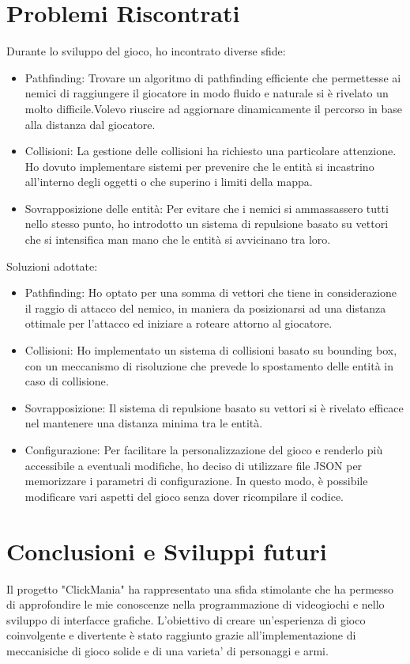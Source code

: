 \documentclass[12pt,a4paper]{report}
\begin{document}
\chapter{Problemi Riscontrati}\label{ch:prog}
Durante lo sviluppo del gioco, ho incontrato diverse sfide:
\begin{itemize}
\item Pathfinding: Trovare un algoritmo di pathfinding efficiente che permettesse ai nemici di raggiungere il giocatore in modo fluido
e naturale si è rivelato un molto difficile.Volevo riuscire ad aggiornare dinamicamente il percorso in base alla distanza dal giocatore.
\item Collisioni: La gestione delle collisioni ha richiesto una particolare attenzione. Ho dovuto implementare sistemi per prevenire che le
entità si incastrino all'interno degli oggetti o che superino i limiti della mappa.
\item Sovrapposizione delle entità: Per evitare che i nemici si ammassassero tutti nello stesso punto, ho introdotto un sistema di repulsione
basato su vettori che si intensifica man mano che le entità si avvicinano tra loro.
\end{itemize}

Soluzioni adottate:
\begin{itemize}
\item Pathfinding: Ho optato per una somma di vettori che tiene in considerazione il raggio di attacco del nemico,
in maniera da posizionarsi ad una distanza ottimale per l’attacco ed iniziare a roteare attorno al giocatore.
\item Collisioni: Ho implementato un sistema di collisioni basato su bounding box, con un meccanismo di risoluzione che prevede
lo spostamento delle entità in caso di collisione.
\item Sovrapposizione: Il sistema di repulsione basato su vettori si è rivelato efficace nel mantenere una distanza minima tra le entità.
\item Configurazione: Per facilitare la personalizzazione del gioco e renderlo più accessibile a eventuali modifiche, ho deciso di
utilizzare file JSON per memorizzare i parametri di configurazione. In questo modo, è possibile modificare vari aspetti del gioco
senza dover ricompilare il codice.
\end{itemize}
\newpage

\chapter{Conclusioni e Sviluppi futuri}\label{ch:prog}
Il progetto "ClickMania" ha rappresentato una sfida stimolante che ha permesso di approfondire le mie conoscenze nella
programmazione di videogiochi e nello sviluppo di interfacce grafiche. L'obiettivo di creare un'esperienza di gioco coinvolgente
e divertente è stato raggiunto grazie all'implementazione di meccanisiche di gioco solide e di una varieta' di personaggi e armi.
\end{document}
